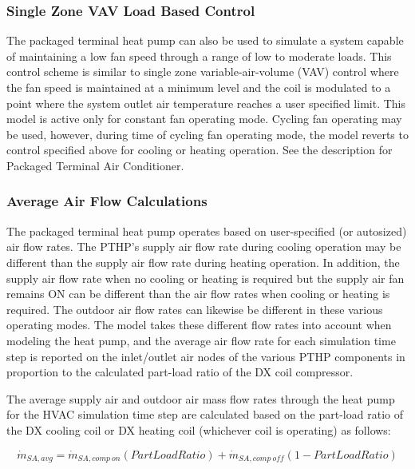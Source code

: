 \subsubsection{Single Zone VAV Load Based Control}\label{single-zone-vav-load-based-control-2}

The packaged terminal heat pump can also be used to simulate a system capable of maintaining a low fan speed
through a range of low to moderate loads. This control scheme is similar to single zone variable-air-volume (VAV) control where the fan speed is maintained at a minimum level and the coil is modulated to a point where the system outlet air temperature reaches a user specified limit. This model is active only for constant fan operating mode. Cycling fan operating may be used, however, during time of cycling fan operating mode, the model reverts to control specified above for cooling or heating operation. See the description for Packaged Terminal Air Conditioner.

\subsubsection{Average Air Flow Calculations}\label{average-air-flow-calculations-1}

The packaged terminal heat pump operates based on user-specified (or autosized) air flow rates. The PTHP's supply air flow rate during cooling operation may be different than the supply air flow rate during heating operation. In addition, the supply air flow rate when no cooling or heating is required but the supply air fan remains ON can be different than the air flow rates when cooling or heating is required. The outdoor air flow rates can likewise be different in these various operating modes. The model takes these different flow rates into account when modeling the heat pump, and the average air flow rate for each simulation time step is reported on the inlet/outlet air nodes of the various PTHP components in proportion to the calculated part-load ratio of the DX coil compressor.

The average supply air and outdoor air mass flow rates through the heat pump for the HVAC simulation time step are calculated based on the part-load ratio of the DX cooling coil or DX heating coil (whichever coil is operating) as follows:

\begin{equation}
\dot m{_{SA,avg}} = \dot m{_{SA,comp~on}}\left( {PartLoadRatio} \right) + \dot m{_{SA,comp~off}}\left( {1 - PartLoadRatio} \right)
\end{equation}

